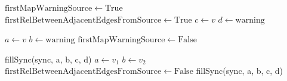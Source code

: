 \documentclass[a4paper]{article}
\begin{document}
\begin{algorithm}
    \begin{algorithmic}[1]
                \State $\mathrm{firstMapWarningSource} \gets \mathrm{True}$
                    \State $\mathrm{firstRelBetweenAdjacentEdgesFromSource} \gets \mathrm{True}$
                        \State $c \gets v$
                        \State $d \gets \mathrm{warning}$

                            \State $a \gets v$
                            \State $b \gets \mathrm{warning}$
                            \State $\mathrm{firstMapWarningSource} \gets \mathrm{False}$
                        \EndIf

                        \State fillSync(sync, a, b, c, d)
                  \EndFor
                            \State $a \gets v_1$ 
                            \State $b \gets v_2$ 
                            \State $\mathrm{firstRelBetweenAdjacentEdgesFromSource} \gets \mathrm{False}$
                        \EndIf 
                        \State fillSync(sync, a, b, c, d)
                    \EndIf
                  \EndFor
             \EndFor
         \EndFor
         \EndFunction
    \end{algorithmic}
\end{algorithm}
\end{document}
